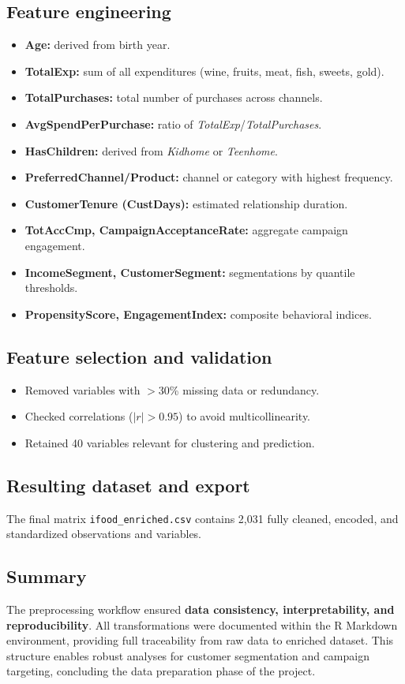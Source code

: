 \subsection{Feature engineering}

\begin{itemize}[leftmargin=1.2cm]
    \item \textbf{Age:} derived from birth year.
    \item \textbf{TotalExp:} sum of all expenditures (wine, fruits, meat, fish, sweets, gold).
    \item \textbf{TotalPurchases:} total number of purchases across channels.
    \item \textbf{AvgSpendPerPurchase:} ratio of \textit{TotalExp}/\textit{TotalPurchases}.
    \item \textbf{HasChildren:} derived from \textit{Kidhome} or \textit{Teenhome}.
    \item \textbf{PreferredChannel/Product:} channel or category with highest frequency.
    \item \textbf{CustomerTenure (CustDays):} estimated relationship duration.
    \item \textbf{TotAccCmp, CampaignAcceptanceRate:} aggregate campaign engagement.
    \item \textbf{IncomeSegment, CustomerSegment:} segmentations by quantile thresholds.
    \item \textbf{PropensityScore, EngagementIndex:} composite behavioral indices.
\end{itemize}

\subsection{Feature selection and validation}

\begin{itemize}[leftmargin=1.2cm]
    \item Removed variables with $>$30\% missing data or redundancy.
    \item Checked correlations ($|r|>0.95$) to avoid multicollinearity.
    \item Retained 40 variables relevant for clustering and prediction.
\end{itemize}

\subsection{Resulting dataset and export}

The final matrix \texttt{ifood\_enriched.csv} contains 2,031 fully cleaned,
encoded, and standardized observations and variables.

\subsection{Summary}

The preprocessing workflow ensured \textbf{data consistency, interpretability, and reproducibility}.
All transformations were documented within the R Markdown environment,
providing full traceability from raw data to enriched dataset.  
This structure enables robust analyses for customer segmentation and campaign
targeting, concluding the data preparation phase of the project.